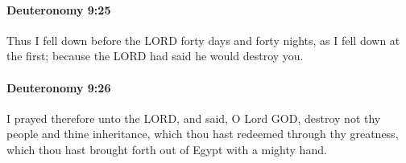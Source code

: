 		\paragraph{Deuteronomy 9:25} %
			\label{DEUTERONOMY-9-25}

			Thus I fell down before the LORD forty days and forty nights, as I fell down at the first; because the LORD had said he would destroy you.


		\paragraph{Deuteronomy 9:26} %
			\label{DEUTERONOMY-9-26}

			I prayed therefore unto the LORD, and said, O Lord GOD, destroy not thy people and thine inheritance, which thou hast redeemed through thy greatness, which thou hast brought forth out of Egypt with a mighty hand.

